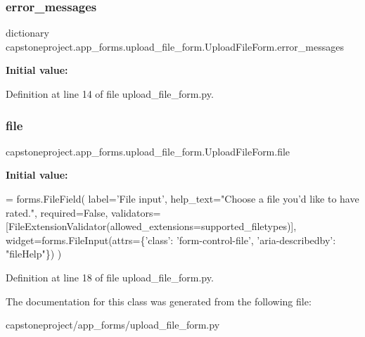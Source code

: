 \subsubsection{\texorpdfstring{error\+\_\+messages}{error\_messages}}
{\footnotesize\ttfamily dictionary capstoneproject.\+app\+\_\+forms.\+upload\+\_\+file\+\_\+form.\+Upload\+File\+Form.\+error\+\_\+messages\hspace{0.3cm}{\ttfamily [static]}}

{\bfseries Initial value\+:}


Definition at line 14 of file upload\+\_\+file\+\_\+form.\+py.

\mbox{\label{classcapstoneproject_1_1app__forms_1_1upload__file__form_1_1_upload_file_form_a5b4474850b2450aa1af59015974415e6}} 
\subsubsection{\texorpdfstring{file}{file}}
{\footnotesize\ttfamily capstoneproject.\+app\+\_\+forms.\+upload\+\_\+file\+\_\+form.\+Upload\+File\+Form.\+file\hspace{0.3cm}{\ttfamily [static]}}

{\bfseries Initial value\+:}
\begin{DoxyCode}
=  forms.FileField(
        label=\textcolor{stringliteral}{'File input'},
        help\_text=\textcolor{stringliteral}{"Choose a file you'd like to have rated."},
        required=\textcolor{keyword}{False},
        validators=[FileExtensionValidator(allowed\_extensions=supported\_filetypes)],
        widget=forms.FileInput(attrs=\{\textcolor{stringliteral}{'class'}: \textcolor{stringliteral}{'form-control-file'},
                                      \textcolor{stringliteral}{'aria-describedby'}: \textcolor{stringliteral}{"fileHelp"}\})
    )
\end{DoxyCode}


Definition at line 18 of file upload\+\_\+file\+\_\+form.\+py.



The documentation for this class was generated from the following file\+:\begin{DoxyCompactItemize}
\item 
capstoneproject/app\+\_\+forms/upload\+\_\+file\+\_\+form.\+py\end{DoxyCompactItemize}
